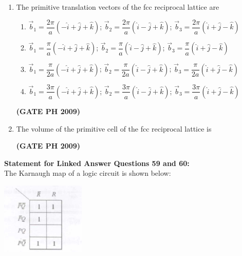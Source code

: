 \documentclass[14pt, a4paper]{extarticle}
\renewcommand{\vec}[1]{\overrightarrow{#1}}
\begin{document}
\begin{enumerate}[label=\textbf{Q. \arabic*}, start=57]

\item The primitive translation vectors of the fcc reciprocal lattice are
\begin{enumerate}
\item $\vec{b}_1 = \dfrac{2\pi}{a}(-\hat{i}+\hat{j}+\hat{k})$; $\vec{b}_2 = \dfrac{2\pi}{a}(\hat{i}-\hat{j}+\hat{k})$; $\vec{b}_3 = \dfrac{2\pi}{a}(\hat{i}+\hat{j}-\hat{k})$
\item $\vec{b}_1 = \dfrac{\pi}{a}(-\hat{i}+\hat{j}+\hat{k})$; $\vec{b}_2 = \dfrac{\pi}{a}(\hat{i}-\hat{j}+\hat{k})$; $\vec{b}_3 = \dfrac{\pi}{a}(\hat{i}+\hat{j}-\hat{k})$
\item $\vec{b}_1 = \dfrac{\pi}{2a}(-\hat{i}+\hat{j}+\hat{k})$; $\vec{b}_2 = \dfrac{\pi}{2a}(\hat{i}-\hat{j}+\hat{k})$; $\vec{b}_3 = \dfrac{\pi}{2a}(\hat{i}+\hat{j}-\hat{k})$
\item $\vec{b}_1 = \dfrac{3\pi}{a}(-\hat{i}+\hat{j}+\hat{k})$; $\vec{b}_2 = \dfrac{3\pi}{a}(\hat{i}-\hat{j}+\hat{k})$; $\vec{b}_3 = \dfrac{3\pi}{a}(\hat{i}+\hat{j}-\hat{k})$
\end{enumerate}
\hfill \textbf{(GATE PH 2009)}

\item The volume of the primitive cell of the fcc reciprocal lattice is
\begin{enumerate}
\end{enumerate}
\hfill \textbf{(GATE PH 2009)}

\end{enumerate}

\vspace{1.5em}
\noindent
\textbf{Statement for Linked Answer Questions 59 and 60:} \\
The Karnaugh map of a logic circuit is shown below:
    \begin{center}
        \includegraphics[width=0.3\textwidth]{figs/Q59-60fig.png}
        \label{fig:q59-60}
    \end{center}
\end{document}
